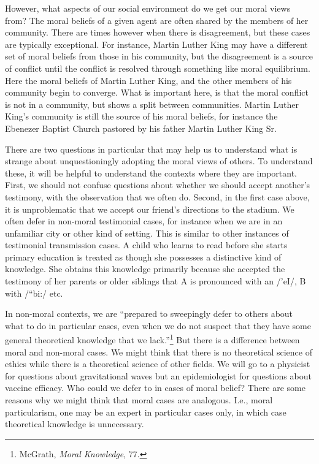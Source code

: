 \documentclass[phdthesis,12pt,final,a4paper]{wuthesis}
\theoremstyle{definition}
\theoremstyle{definition}
\theoremstyle{definition}
\theoremstyle{definition}
\theoremstyle{remark}
\begin{document}
However, what aspects of our social environment do we get our moral views from? The moral beliefs of a given agent are often shared by the members of her community. There are times however when there is disagreement, but these cases are typically exceptional. For instance, Martin Luther King may have a different set of moral beliefs from those in his community, but the disagreement is a source of conflict until the conflict is resolved through something like moral equilibrium. Here the moral beliefs of Martin Luther King, and the other members of his community begin to converge. What is important here, is that the moral conflict is not in a community, but shows a split between communities. Martin Luther King's community is still the source of his moral beliefs, for instance the Ebenezer Baptist Church pastored by his father Martin Luther King Sr.

There are two questions in particular that may help us to understand what is strange about unquestioningly adopting the moral views of others. To understand these, it will be helpful to understand the contexts where they are important. First, we should not confuse questions about whether we should accept another's testimony, with the observation that we often do. Second, in the first case above, it is unproblematic that we accept our friend's directions to the stadium. We often defer in non-moral testimonial cases, for instance when we are in an unfamiliar city or other kind of setting. This is similar to other instances of testimonial transmission cases. A child who learns to read before she starts primary education is treated as though she possesses a distinctive kind of knowledge. She obtains this knowledge primarily because she accepted the testimony of her parents or older siblings that A is pronounced with an /'eI/, B with /``bi:/ etc.

In non-moral contexts, we are ``prepared to sweepingly defer to others about what to do in particular cases, even when we do not suspect that they have some general theoretical knowledge that we lack.''\footnote{McGrath, \emph{Moral {Knowledge}}, 77.} But there is a difference between moral and non-moral cases. We might think that there is no theoretical science of ethics while there is a theoretical science of other fields. We will go to a physicist for questions about gravitational waves but an epidemiologist for questions about vaccine efficacy. Who could we defer to in cases of moral belief? There are some reasons why we might think that moral cases are analogous. I.e., moral particularism, one may be an expert in particular cases only, in which case theoretical knowledge is unnecessary.
\end{document}
